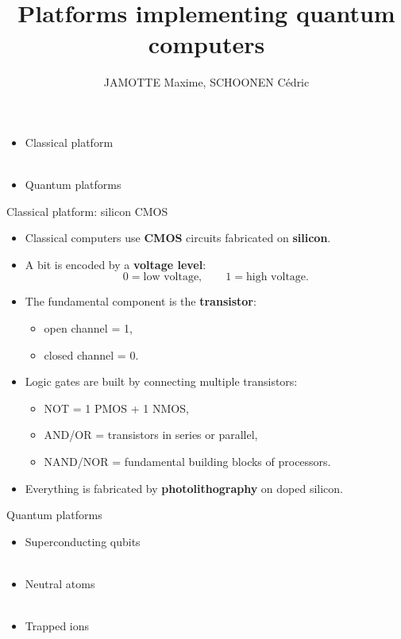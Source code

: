 \documentclass[aspectratio=169,12pt]{beamer}
\title{Platforms implementing quantum computers}
\author{JAMOTTE Maxime, SCHOONEN Cédric}
\institute{Digital Learning Hub}
\date{}
\begin{document}
\begin{frame}
  \titlepage
\end{frame}

\begin{frame}
    \begin{itemize}
        \item Classical platform\\~\\
        \item Quantum platforms
    \end{itemize}
\end{frame}

\begin{frame}{Classical platform: silicon CMOS}
\begin{itemize}
    \item Classical computers use \textbf{CMOS} circuits fabricated on \textbf{silicon}.
    \item A bit is encoded by a \textbf{voltage level}:
    \[
        0 = \text{low voltage}, \qquad 1 = \text{high voltage}.
    \]
    \item The fundamental component is the \textbf{transistor}:
    \begin{itemize}
        \item open channel = 1,
        \item closed channel = 0.
    \end{itemize}
    \item Logic gates are built by connecting multiple transistors:
    \begin{itemize}
        \item NOT = 1 PMOS + 1 NMOS,
        \item AND/OR = transistors in series or parallel,
        \item NAND/NOR = fundamental building blocks of processors.
    \end{itemize}
    \item Everything is fabricated by \textbf{photolithography} on doped silicon.
\end{itemize}
\end{frame}



\begin{frame}{Quantum platforms}
\begin{itemize}
    \item Superconducting qubits\\~\\
    \item Neutral atoms\\~\\
    \item Trapped ions\\~\\
\end{itemize}
\end{frame}
\end{document}
